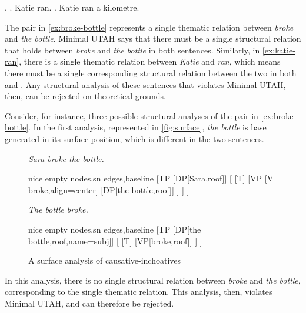 \documentclass[MilwayThesis]{subfiles}
\begin{document}
\ex. \label{ex:katie-ran}
\a. Katie ran.
\b. Katie ran a kilometre.

The pair in \ref{ex:broke-bottle} represents a single thematic relation between \textit{broke} and \textit{the bottle}.
Minimal UTAH says that there must be a single structural relation that holds between \textit{broke} and \textit{the bottle} in both sentences.
Similarly, in \ref{ex:katie-ran}, there is a single thematic relation between \textit{Katie} and \textit{ran}, which means there must be a single corresponding structural relation between the two in both \Last[a] and \Last[b].
Any structural analysis of these sentences that violates Minimal UTAH, then, can be rejected on theoretical grounds.

Consider, for instance, three possible structural analyses of the pair in \ref{ex:broke-bottle}.
In the first analysis, represented in \autoref{fig:surface}, \textit{the bottle} is base generated in its surface position, which is different in the two sentences.
\begin{figure}[h]
	\centering
	\begin{minipage}[t]{.45\textwidth}
		\textit{Sara broke the bottle.}\\
		\begin{forest}
		  nice empty nodes,sn edges,baseline
		  [TP
		    [DP[Sara,roof]]
		    [
		      [T]
		      [VP
			[V\\broke,align=center]
			[DP[the bottle,roof]]
		      ]
		    ]
		  ]
		\end{forest}	
	\end{minipage}
	\begin{minipage}[t]{0.45\textwidth}
	\textit{The bottle broke.}\\
		\begin{forest}
		  nice empty nodes,sn edges,baseline
		  [TP
		    [DP[the bottle,roof,name=subj]]
		    [
		      [T]
		      [VP[broke,roof]]
		    ]
		  ]
		\end{forest}	
	\end{minipage}
	\caption{A surface analysis of causative-inchoatives}
	\label{fig:surface}
\end{figure}
In this analysis, there is no single structural relation between \textit{broke} and \textit{the bottle}, corresponding to the single thematic relation.
This analysis, then, violates Minimal UTAH, and can therefore be rejected.
\end{document}
